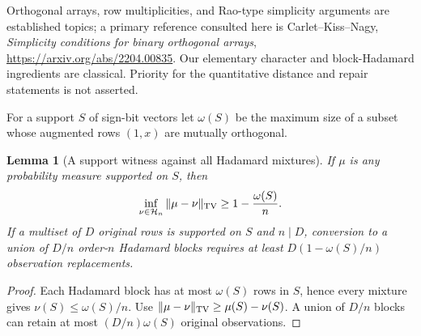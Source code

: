 \documentclass[11pt]{article}
\newtheorem{lemma}[theorem]{Lemma}
\begin{document}
Orthogonal arrays, row multiplicities, and Rao-type simplicity arguments
are established topics; a primary reference consulted here is
Carlet--Kiss--Nagy, \emph{Simplicity conditions for binary orthogonal arrays},
\url{https://arxiv.org/abs/2204.00835}. Our elementary character and
block-Hadamard ingredients are classical. Priority for the quantitative
distance and repair statements is not asserted.

For a support $S$ of sign-bit vectors let $\omega(S)$ be the maximum
size of a subset whose augmented rows $(1,x)$ are mutually orthogonal.
\begin{lemma}[A support witness against all Hadamard mixtures]
\label{lem:design-support-witness}
If $\mu$ is any probability measure supported on $S$, then
\[
 \inf_{\nu\in\mathcal H_n}\|\mu-\nu\|_{\rm TV}
 \ge1-\frac{\omega(S)}n.
\]
If a multiset of $D$ original rows is supported on $S$ and $n\mid D$,
conversion to a union of $D/n$ order-$n$ Hadamard blocks requires at
least $D(1-\omega(S)/n)$ observation replacements.
\end{lemma}
\begin{proof}
Each Hadamard block has at most $\omega(S)$ rows in $S$, hence every
mixture gives $\nu(S)\le\omega(S)/n$. Use
$\|\mu-\nu\|_{\rm TV}\ge\mu(S)-\nu(S)$. A union of $D/n$ blocks
can retain at most $(D/n)\omega(S)$ original observations.
\end{proof}
\end{document}
